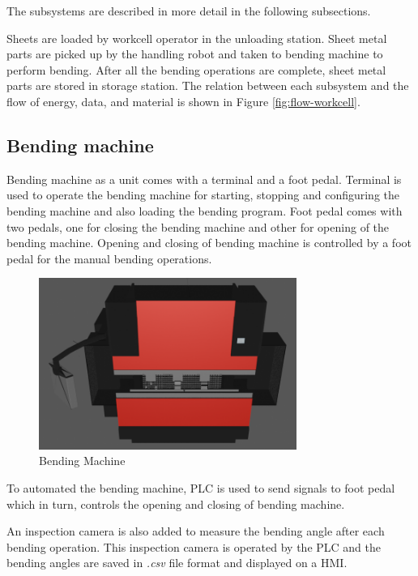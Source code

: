 The subsystems are described in more detail in the following
subsections. 


Sheets are loaded by workcell operator in the unloading station. Sheet metal parts are picked up by the handling robot and taken to bending machine to perform bending.
After all the bending operations are complete, sheet metal parts are stored in storage station.
The relation between each subsystem and the flow of energy, data, and material is shown in Figure \ref{fig:flow-workcell}.




\subsection{Bending machine}
\label{sub:bending-machine}
Bending machine as a unit comes with a terminal and a foot pedal. Terminal is used to operate
the bending machine for starting, stopping and configuring the bending machine and also loading the bending program.
Foot pedal comes with two pedals, one for closing the bending machine and other for opening of the bending machine.
Opening and closing of bending machine is controlled by a foot pedal for the manual bending operations.

\begin{figure}[h]
    \centering
    \includegraphics[width=0.75\textwidth]{figures/bending-machine-blender.png}
    \caption{Bending Machine}
    \label{fig:bending-machine-blender}
\end{figure}
To automated the bending machine, PLC is used to send signals to foot pedal which in turn, controls the opening and closing of bending machine.

An inspection camera is also added to measure the bending angle after each bending operation. This inspection camera is operated by the PLC
and the bending angles are saved in \textit{.csv} file format and displayed on a HMI.

